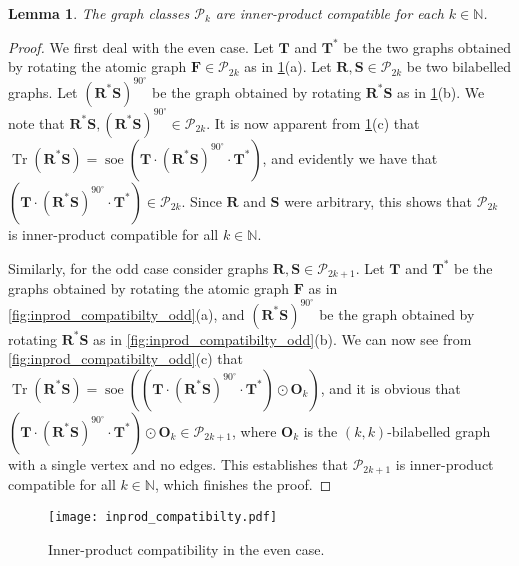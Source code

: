 \documentclass[11pt,a4paper]{article}
\theoremstyle{plain}
\newtheorem{lem}[thm]{Lemma}
\theoremstyle{remark}
\theoremstyle{definition}
\DeclareMathOperator{\tr}{Tr}
\DeclareMathOperator{\soe}{soe}
\def\calP{{\mathcal P}} \def\calQ{{\mathcal Q}} \def\calR{{\mathcal R}}
\begin{document}
\begin{lem}\label{lem:inn-pro-comp}
    The graph classes $\calP_k$ are inner-product compatible for each $k \in \mathbb{N}$. 
\end{lem}
\begin{proof}
    We first deal with the even case. Let $\boldsymbol{T}$ and $\boldsymbol{T^*}$ be the two graphs obtained by rotating the atomic graph $\boldsymbol{F} \in \calP_{2k}$ as in \cref{fig:inprod_compatibilty}(a). Let $\boldsymbol{R}, \boldsymbol{S} \in \calP_{2k}$ be two bilabelled graphs. Let $(\boldsymbol{R}^*\boldsymbol{S})^{90^\circ}$ be the graph obtained by rotating $\boldsymbol{R}^*\boldsymbol{S}$ as in \cref{fig:inprod_compatibilty}(b). We note that $\boldsymbol{R}^*\boldsymbol{S}, (\boldsymbol{R}^*\boldsymbol{S})^{90^\circ} \in \calP_{2k}$. It is now apparent from \cref{fig:inprod_compatibilty}(c) that $\tr(\boldsymbol{R}^*\boldsymbol{S}) = \soe(\boldsymbol{T} \cdot (\boldsymbol{R}^*\boldsymbol{S})^{90^\circ} \cdot \boldsymbol{T^*})$, and evidently we have that $(\boldsymbol{T} \cdot (\boldsymbol{R}^*\boldsymbol{S})^{90^\circ} \cdot \boldsymbol{T^*}) \in \calP_{2k}$. Since $\boldsymbol{R}$ and $\boldsymbol{S}$ were arbitrary, this shows that $\calP_{2k}$ is inner-product compatible for all $k \in \mathbb{N}$. 

    Similarly, for the odd case consider graphs $\boldsymbol{R}, \boldsymbol{S} \in \calP_{2k+1}$. Let $\boldsymbol{T}$ and $\boldsymbol{T^*}$ be the graphs obtained by rotating the atomic graph $\boldsymbol{F}$ as in \cref{fig:inprod_compatibilty_odd}(a), and $(\boldsymbol{R}^*\boldsymbol{S})^{90^\circ}$ be the graph obtained by rotating $\boldsymbol{R}^*\boldsymbol{S}$ as in \cref{fig:inprod_compatibilty_odd}(b). We can now see from \cref{fig:inprod_compatibilty_odd}(c) that $\tr(\boldsymbol{R}^*\boldsymbol{S}) = \soe((\boldsymbol{T} \cdot (\boldsymbol{R}^*\boldsymbol{S})^{90^\circ} \cdot \boldsymbol{T^*}) \odot \boldsymbol{O}_k)$, and it is obvious that $(\boldsymbol{T} \cdot (\boldsymbol{R}^*\boldsymbol{S})^{90^\circ} \cdot \boldsymbol{T^*}) \odot \boldsymbol{O}_k \in \calP_{2k+1}$, where $\boldsymbol{O}_k$ is the $(k,k)$-bilabelled graph with a single vertex and no edges. This establishes that $\calP_{2k+1}$ is inner-product compatible for all $k \in \mathbb{N}$, which finishes the proof. 
\end{proof}

\begin{figure}[t]
  \centering
  \texttt{[image: inprod\_compatibilty.pdf]}
  \caption{Inner-product compatibility in the even case.}
  \label{fig:inprod_compatibilty}
\end{figure}
\end{document}
